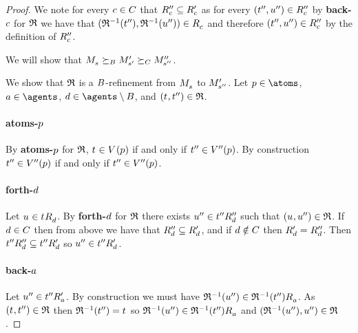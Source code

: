 \begin{proof}
We note for every $c \in C$ that ${R^{\prime\prime}_{c}} \subseteq {R^{\prime}_{c}}$ as for every $({t}^{\prime\prime}, {u}^{\prime\prime}) \in {R^{\prime\prime}_{c}}$ by {\bf back-$c$} for $\mathfrak{R}$ we have that $(\refinement^{-1}(\kStateTPP), \refinement^{-1}(\kStateUPP)) \in \kAccessibilityC$ and therefore $({t}^{\prime\prime}, {u}^{\prime\prime}) \in {R^{\prime\prime}_{c}}$ by the definition of ${R^{\prime\prime}_{c}}$.

We will show that $\kPModel{\kStateS} \simulatesBs \kPModelP{\kStateSP} \simulatesCs \kPModelPP{\kStateSPP}$.

We show that $\mathfrak{R}$ is a $B$-refinement from $\kPModel{\kStateS}$ to ${M^{\prime}_{{s}^{\prime\prime}}}$.
Let $\atomP \in \atoms$, $\agentA \in \agents$, $\agentD \in \agents \setminus \agentsB$, and $(\kStateT, \kStateTPP) \in \refinement$.

\paragraph{atoms-$p$}
By {\bf atoms-$p$} for $\mathfrak{R}$, $\kStateT \in \kValuation(\atomP)$ if and only if ${t}^{\prime\prime} \in {V^{\prime\prime}}(p)$.
By construction ${t}^{\prime\prime} \in {V^{\prime\prime}}(p)$ if and only if ${t}^{\prime\prime} \in {V^{\prime\prime}}(p)$.

\paragraph{forth-$d$}
Let $\kStateU \in \kSuccessorsD{\kStateT}$.
By {\bf forth-$d$} for $\mathfrak{R}$ there exists ${u}^{\prime\prime} \in {{t}^{\prime\prime}} {R^{\prime\prime}_{d}}$ such that $(\kStateU, \kStateUPP) \in \refinement$.
If $d \in C$ then from above we have that ${R^{\prime\prime}_{d}} \subseteq {R^{\prime}_{d}}$, and if $d \notin C$ then ${R^{\prime}_{d}} = {R^{\prime\prime}_{d}}$.
Then ${{t}^{\prime\prime}} {R^{\prime\prime}_{d}} \subseteq {{t}^{\prime\prime}} {R^{\prime}_{d}}$ so ${u}^{\prime\prime} \in {{t}^{\prime\prime}} {R^{\prime}_{d}}$.

\paragraph{back-$a$}
Let ${u}^{\prime\prime} \in {{t}^{\prime\prime}} {R^{\prime}_{a}}$.
By construction we must have $\refinement^{-1}(\kStateUPP) \in \kSuccessorsA{\refinement^{-1}(\kStateTPP)}$.
As $(\kStateT, \kStateTPP) \in \refinement$ then $\refinement^{-1}(\kStateTPP) = \kStateT$ so $\refinement^{-1}(\kStateUPP) \in \kSuccessorsA{\refinement^{-1}(\kStateTPP)}$ and $(\mathfrak{R}^{-1}({u}^{\prime\prime}), {u}^{\prime\prime}) \in \mathfrak{R}$.


\end{proof}
